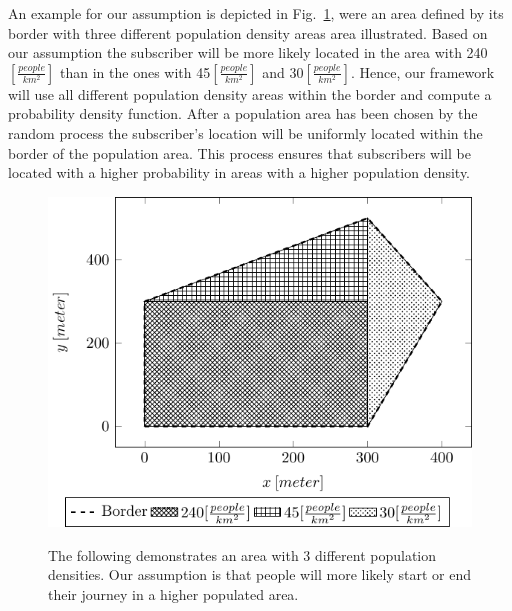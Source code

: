 An example for our assumption is depicted in Fig.~\ref{fig:populationgrid}, were an area defined by its border with three different population density areas area illustrated. Based on our assumption the subscriber will be more likely located in the area with 240$[\frac{people}{km^2}]$ than in the ones with 45$[\frac{people}{km^2}]$ and 30$[\frac{people}{km^2}]$. Hence, our framework will use all different population density areas within the border and compute a probability density function. After a population area has been chosen by the random process the subscriber's location will be uniformly located within the border of the population area. This process ensures that subscribers will be located with a higher probability in areas with a higher population density.
	\begin{figure}[h!]

		\caption{ The following demonstrates an area with 3 different population densities. Our assumption is that people will more likely start or end their journey in a higher populated area.
		}
		\includegraphics[width=0.9\columnwidth]{populationgrid}
				\label{fig:populationgrid}
	\end{figure}
